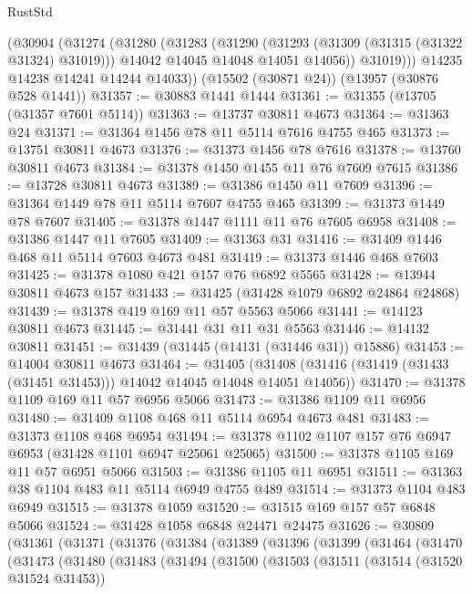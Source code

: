 \begin{lexlean}{RustStd}
\begin{coremodule}
        (@30904
          (@31274
            (@31280
              (@31283
                (@31290
                  (@31293 (@31309 (@31315 (@31322 @31324) @31019)))
                  @14042
                  @14045
                  @14048
                  @14051
                  @14056))
              @31019)))
        @14235
        @14238
        @14241
        @14244
        @14033))
    (@15502 (@30871 @24))
    (@13957 (@30876 @528 @1441))
@31357 := @30883 @1441 @1444
@31361 := @31355 (@13705 (@31357 @7601 @5114))
@31363 := @13737 @30811 @4673
@31364 := @31363 @24
@31371 := @31364 @1456 @78 @11 @5114 @7616 @4755 @465
@31373 := @13751 @30811 @4673
@31376 := @31373 @1456 @78 @7616
@31378 := @13760 @30811 @4673
@31384 := @31378 @1450 @1455 @11 @76 @7609 @7615
@31386 := @13728 @30811 @4673
@31389 := @31386 @1450 @11 @7609
@31396 := @31364 @1449 @78 @11 @5114 @7607 @4755 @465
@31399 := @31373 @1449 @78 @7607
@31405 := @31378 @1447 @1111 @11 @76 @7605 @6958
@31408 := @31386 @1447 @11 @7605
@31409 := @31363 @31
@31416 := @31409 @1446 @468 @11 @5114 @7603 @4673 @481
@31419 := @31373 @1446 @468 @7603
@31425 := @31378 @1080 @421 @157 @76 @6892 @5565
@31428 := @13944 @30811 @4673 @157
@31433 := @31425 (@31428 @1079 @6892 @24864 @24868)
@31439 := @31378 @419 @169 @11 @57 @5563 @5066
@31441 := @14123 @30811 @4673
@31445 := @31441 @31 @11 @31 @5563
@31446 := @14132 @30811
@31451 := @31439 (@31445 (@14131 (@31446 @31)) @15886)
@31453 := @14004 @30811 @4673
@31464 := @31405
    (@31408 (@31416 (@31419 (@31433 (@31451 @31453))) @14042 @14045 @14048 @14051 @14056))
@31470 := @31378 @1109 @169 @11 @57 @6956 @5066
@31473 := @31386 @1109 @11 @6956
@31480 := @31409 @1108 @468 @11 @5114 @6954 @4673 @481
@31483 := @31373 @1108 @468 @6954
@31494 := @31378 @1102 @1107 @157 @76 @6947 @6953 (@31428 @1101 @6947 @25061 @25065)
@31500 := @31378 @1105 @169 @11 @57 @6951 @5066
@31503 := @31386 @1105 @11 @6951
@31511 := @31363 @38 @1104 @483 @11 @5114 @6949 @4755 @489
@31514 := @31373 @1104 @483 @6949
@31515 := @31378 @1059
@31520 := @31515 @169 @157 @57 @6848 @5066
@31524 := @31428 @1058 @6848 @24471 @24475
@31626 := @30809
    (@31361
      (@31371
        (@31376
          (@31384
            (@31389
              (@31396
                (@31399
                  (@31464
                    (@31470
                      (@31473
                        (@31480
                          (@31483
                            (@31494
                              (@31500
                                (@31503
                                  (@31511
                                    (@31514 (@31520 @31524 @31453))

\end{coremodule}
\end{lexlean}
